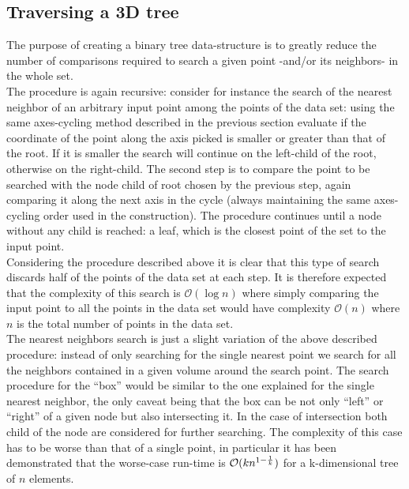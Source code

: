 \subsection{Traversing a 3D tree}
The purpose of creating a binary tree data-structure is to greatly reduce the number of comparisons required to search a given point -and/or its neighbors- in the whole set.\\
The procedure is again recursive: consider for instance the search of the nearest neighbor of an arbitrary input point among the points of the data set: using the same axes-cycling method described in the previous section evaluate if the coordinate of the point along the axis picked is smaller or greater than that of the root. If it is smaller the search will continue on the left-child of the root, otherwise on the right-child. The second step is to compare the point to be searched with the node child of root chosen by the previous step, again comparing it along the next axis in the cycle (always maintaining the same axes-cycling order used in the construction). The procedure continues until a node without any child is reached: a leaf, which is the closest point of the set to the input point.\\
Considering the procedure described above it is clear that this type of search discards half of the points of the data set at each step. It is therefore expected that the complexity of this search is $\mathcal{O}(\log{} n)$ where simply comparing the input point to all the points in the data set would have complexity $\mathcal{O}(n)$ where $n$ is the total number of points in the data set.\\
The nearest neighbors search is just a slight variation of the above described procedure: instead of only searching for the single nearest point we search for all the neighbors contained in a given volume around the search point. The search procedure for the ``box'' would be similar to the one explained for the single nearest neighbor, the only caveat being that the box can be not only ``left'' or ``right'' of a given node but also intersecting it. In the case of intersection both child of the node are considered for further searching. The complexity of this case has to be worse than that of a single point, in particular it has been demonstrated \cite{worst-case-search} that the worse-case run-time is $\mathcal{O}(k n ^{1 - {1\over k}})$ for a k-dimensional tree of $n$ elements.

